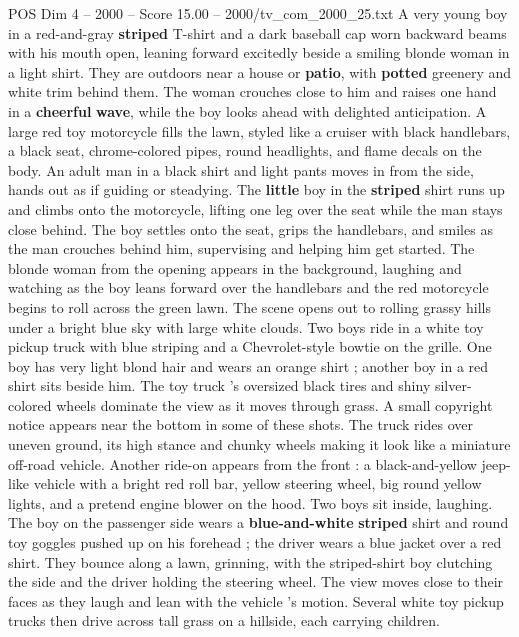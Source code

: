 \begin{textsample}{POS Dim 4 – 2000 – Score 15.00 – 2000/tv\_com\_2000\_25.txt}  \label{ex:f4_pos_054}
A very young boy in a red-and-gray \textbf{striped} T-shirt and a dark baseball cap worn backward beams with his mouth open, leaning forward excitedly beside a smiling blonde woman in a light shirt.
They are outdoors near a house or \textbf{patio}, with \textbf{potted} greenery and white trim behind them.
The woman crouches close to him and raises one hand in a \textbf{cheerful} \textbf{wave}, while the boy looks ahead with delighted anticipation.
A large red toy motorcycle fills the lawn, styled like a cruiser with black handlebars, a black seat, chrome-colored pipes, round headlights, and flame decals on the body.
An adult man in a black shirt and light pants moves in from the side, hands out as if guiding or steadying.
The \textbf{little} boy in the \textbf{striped} shirt runs up and climbs onto the motorcycle, lifting one leg over the seat while the man stays close behind.
The boy settles onto the seat, grips the handlebars, and smiles as the man crouches behind him, supervising and helping him get started.
The blonde woman from the opening appears in the background, laughing and watching as the boy leans forward over the handlebars and the red motorcycle begins to roll across the green lawn.
The scene opens out to rolling grassy hills under a bright blue sky with large white clouds.
Two boys ride in a white toy pickup truck with blue striping and a Chevrolet-style bowtie on the grille.
One boy has very light blond hair and wears an orange shirt ; another boy in a red shirt sits beside him.
The toy truck ’s oversized black tires and shiny silver-colored wheels dominate the view as it moves through grass.
A small copyright notice appears near the bottom in some of these shots.
The truck rides over uneven ground, its high stance and chunky wheels making it look like a miniature off-road vehicle.
Another ride-on appears from the front : a black-and-yellow jeep-like vehicle with a bright red roll bar, yellow steering wheel, big round yellow lights, and a pretend engine blower on the hood.
Two boys sit inside, laughing.
The boy on the passenger side wears a \textbf{blue-and-white} \textbf{striped} shirt and round toy goggles pushed up on his forehead ; the driver wears a blue jacket over a red shirt.
They bounce along a lawn, grinning, with the striped-shirt boy clutching the side and the driver holding the steering wheel.
The view moves close to their faces as they laugh and lean with the vehicle ’s motion.
Several white toy pickup trucks then drive across tall grass on a hillside, each carrying children.

\end{textsample}
